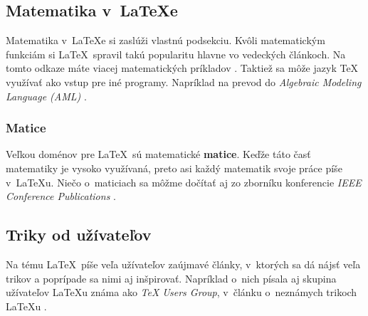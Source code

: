 \documentclass[a4paper, 11pt]{article}
\begin{document}
\subsection{Matematika v~\LaTeX e}
Matematika v~\LaTeX e si zaslúži vlastnú podsekciu. Kvôli matematickým funkciám si \LaTeX\ spravil takú popularitu hlavne vo vedeckých článkoch. Na tomto odkaze máte viacej matematických príkladov \cite{MathLatexWiki}. Taktiež sa môže jazyk TeX využívať ako vstup pre iné programy. Napríklad na prevod do \textit{Algebraic Modeling Language (AML)} \cite{ArticleMath}.

\subsubsection{Matice}
Veľkou doménov pre \LaTeX\ sú matematické \textbf{matice}. Keďže táto časť matematiky je vysoko využívaná, preto asi každý matematik svoje práce píše v~\LaTeX u. Niečo o~maticiach sa môžme dočítať aj zo zborníku konferencie \textit{
IEEE Conference Publications} \cite{ProceedingMatrix}.

\subsection{Triky od užívateľov}
Na tému \LaTeX\ píše veľa užívateľov zaújmavé články, v~ktorých sa dá nájsť veľa trikov a poprípade sa nimi aj inšpirovať. Napríklad o~nich písala aj skupina užívateľov \LaTeX u známa ako \textit{TeX Users Group}, v~článku o~neznámych trikoch \LaTeX u \cite{ArticleTips}.


\newpage


\end{document}

